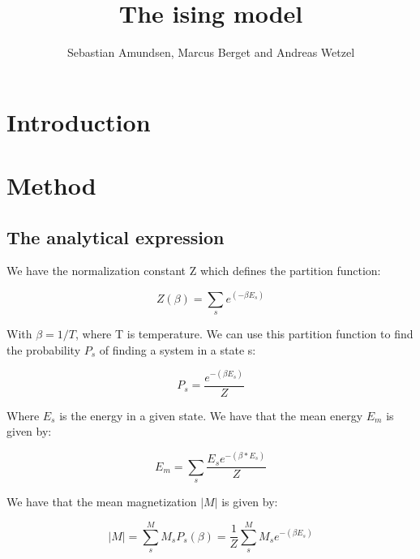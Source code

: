\documentclass{article}
\begin{document}
\title{The ising model}
\author{Sebastian Amundsen, Marcus Berget and Andreas Wetzel}

\maketitle

\begin{abstract}

\end{abstract}

\begin{multicols}{2}

\section{Introduction}

\section{Method}

\subsection*{The analytical expression}

We have the normalization constant Z which defines the partition function:

\begin{equation}
Z(\beta) = \sum_{s} e^{(-\beta E_s)}
\label{eq:Z}
\end{equation}

With $\beta=1/T$, where T is temperature. We can use this partition function to find the probability $P_s$ of finding a system in a state s:

\begin{equation}
P_s=\frac{e^{-(\beta E_s)}}{Z}
\label{eq:P_s}
\end{equation}

Where $E_s$ is the energy in a given state. We have that the mean energy $E_m$ is given by:

\begin{equation}
E_m = \sum_s \frac{E_s e^{-(\beta*E_s)}}{Z}
\label{eq:E_m}
\end{equation}

We have that the mean magnetization $|M|$ is given by:

\begin{equation}
|M|=\sum_s^M M_s P_s(\beta)=\frac{1}{Z}\sum_s^M M_s e^{-(\beta E_s)}
\label{eq:mM}
\end{equation}


\end{multicols}
\end{document}
